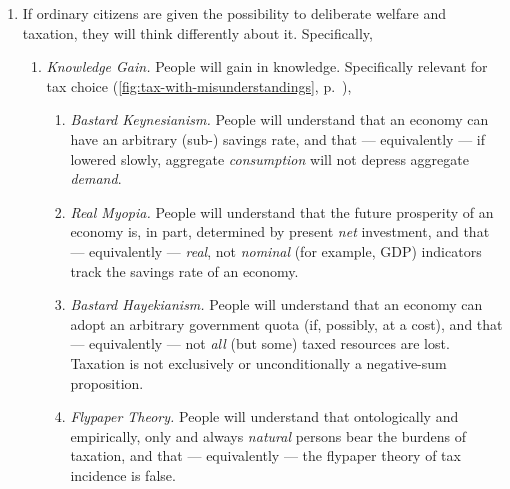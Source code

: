 
\begin{enumerate}
    \item \label{itm:think-different}
		If ordinary citizens are given the possibility to deliberate welfare and taxation, they will think differently about it.
		Specifically,
		\begin{enumerate}
		
			\item \label{itm:knowledge-gain}
				\emph{Knowledge Gain.}
				People will gain in knowledge.
				Specifically relevant for tax choice (\autoref{fig:tax-with-misunderstandings}, p.~\pageref{fig:tax-with-misunderstandings}),
				\begin{enumerate}
				
					\item \label{itm:bastard-keynesianism} 
						\emph{Bastard Keynesianism.}
						People will understand that an economy can have an arbitrary (sub-\citeauthor{Solow1956}) savings rate, and that --- equivalently --- if lowered slowly, aggregate \emph{consumption} will not depress aggregate \emph{demand}.
				
					\item \label{itm:real-myopia}
						\emph{Real Myopia.} %
						People will understand that the future prosperity of an economy is, in part, determined by present \emph{net} investment, and that --- equivalently --- \emph{real}, not \emph{nominal} (for example, \gls{GDP}) indicators track the savings rate of an economy.
				
					\item \label{itm:bastard-hayekianism} %
						\emph{Bastard Hayekianism.} %
						People will understand that an economy can adopt an arbitrary government quota (if, possibly, at a cost), and that --- equivalently --- not \emph{all} (but some) taxed resources are lost.
						Taxation is not exclusively or unconditionally a negative-sum proposition.
				
					\item \label{itm:flyper-theory} %
						\emph{Flypaper Theory.}
						People will understand that ontologically and empirically, only and always \emph{natural} persons bear the burdens of taxation, and that --- equivalently --- the flypaper theory of tax incidence is false.
						

\end{enumerate}
\end{enumerate}
\end{enumerate}
